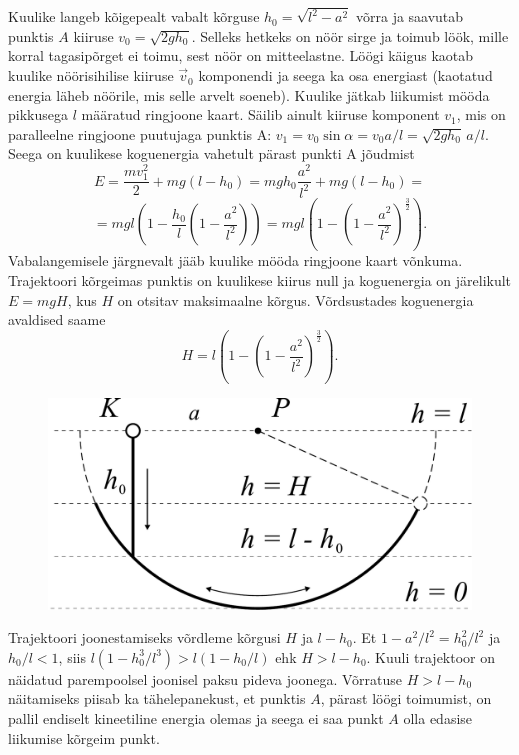 \documentclass[10pt]{article}
\begin{document}
Kuulike langeb kõigepealt vabalt kõrguse $h_0=\sqrt{l^2-a^2}$ võrra ja saavutab punktis $A$ kiiruse $v_0=\sqrt{2gh_0}$. Selleks hetkeks on nöör sirge ja toimub löök, mille korral tagasipõrget ei toimu, sest nöör on mitteelastne. Löögi käigus kaotab kuulike nöörisihilise kiiruse $\Vec{v}_0$ komponendi ja seega ka osa energiast (kaotatud energia läheb nöörile, mis selle arvelt soeneb). Kuulike jätkab liikumist mööda pikkusega $l$ määratud ringjoone kaart. Säilib ainult kiiruse komponent $v_1$, mis on paralleelne ringjoone puutujaga punktis A: $v_1=v_0\sin\alpha=v_0a/l=\sqrt{2gh_0}\,a/l$. Seega on kuulikese koguenergia vahetult pärast punkti A jõudmist
\[E = \frac{mv_1^2}{2}+mg(l-h_0)=mgh_0\frac{a^2}{l^2}+mg(l-h_0)=\]
\[=mgl\left(1-\frac{h_0}{l}\left(1-\frac{a^2}{l^2}\right)\right)=mgl\left(1-\left(1-\frac{a^2}{l^2}\right)^{\frac{3}{2}}\right).\]
Vabalangemisele järgnevalt jääb kuulike mööda ringjoone kaart võnkuma. Trajektoori kõrgeimas punktis on kuulikese kiirus null ja koguenergia on järelikult $E=mgH$, kus $H$ on otsitav maksimaalne kõrgus. Võrdsustades koguenergia avaldised saame
\[H=l\left(1-\left(1-\frac{a^2}{l^2}\right)^{\frac{3}{2}}\right).\]

\begin{figure}
\vspace{-1cm}
  \begin{center}
    \includegraphics[width=1\linewidth]{2024-v2g-06-yl2.pdf}
  \end{center}
  \vspace{-1.0cm}
\end{figure}

Trajektoori joonestamiseks võrdleme kõrgusi $H$ ja $l-h_0$. Et $1-a^2/l^2=h_0^2/l^2$ ja $h_0/l<1$, siis
$l(1-h_0^3/l^3)>l(1-h_0/l)$
ehk $H>l-h_0$.
Kuuli trajektoor on näidatud parempoolsel joonisel paksu pideva joonega. Võrratuse $H>l-h_0$ näitamiseks piisab ka tähelepanekust, et punktis $A$, pärast löögi toimumist, on pallil endiselt kineetiline energia olemas ja seega ei saa punkt $A$ olla edasise liikumise kõrgeim punkt.
\probend
\bigskip
\end{document}
